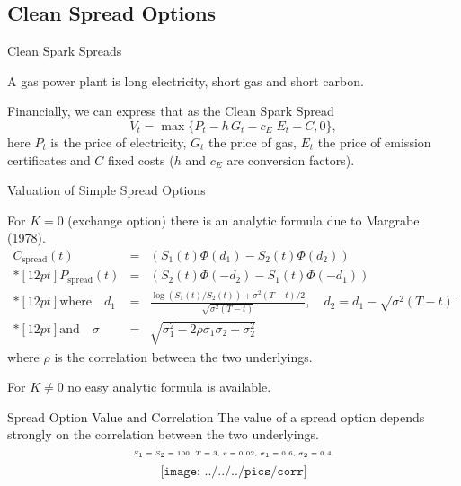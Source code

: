 \subsection{Clean Spread Options}

{Clean Spark Spreads}


	A gas power plant is  long electricity, short gas and short carbon.

	Financially, we can express that as the Clean Spark Spread
\begin{equation}
V_t = \max\{P_t - h\,G_t - c_E\;E_t - C, 0\},
\label{spark_spread_value}
\end{equation}
here  $P_t$ is the price of electricity, $G_t$ the price of gas, $E_t$ the price of emission certificates  and $C$ fixed costs ($h$ and $c_E$ are conversion factors).



{Valuation of Simple Spread Options}

For $K=0$ (exchange option) there is an analytic formula due to
Margrabe (1978).
$$\begin{array}{lll}
 C_{\mbox{spread}}(t) & = & (S_1(t)\Phi(d_1)-S_2(t)\Phi(d_2))
 \\*[12pt]
 P_{\mbox{spread}}(t) & = & (S_2(t)\Phi(-d_2)-S_1(t)\Phi(-d_1))
 \\*[12pt]
 \mbox{where}\quad d_1 & = & \frac{\log(S_1(t)/S_2(t))+\sigma^{2}(T-t)/2}{\sqrt{\sigma^{2}(T-t)}},\quad d_2=d_1-\sqrt{\sigma^{2}(T-t)}
 \\*[12pt]
 \mbox{and}\quad \sigma & = & \sqrt{\sigma_1^2-2\rho\sigma_1\sigma_2+\sigma_2^2}
\end{array}$$
where $\rho$ is the correlation between the two underlyings.

For $K\neq 0$ no easy analytic formula is available.

{Spread Option Value and Correlation}
The value of a spread option depends strongly on the correlation between the two underlyings.
$$\tiny\text{$S_1=S_2=100$, $T=3$, $r=0.02$, $\sigma_1=0.6$, $\sigma_2=0.4$.}$$
\vspace{-0.76cm}
$$\texttt{[image: ../../../pics/corr]}$$


